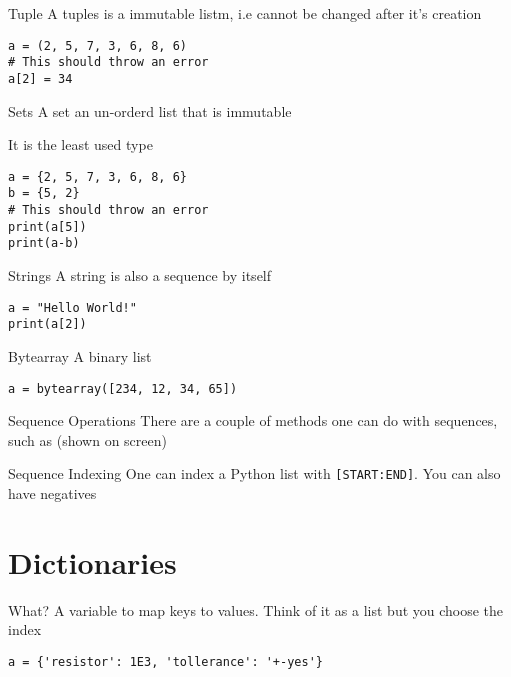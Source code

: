\documentclass[10pt]{beamer}
\begin{document}
\begin{frame}[containsverbatim]{Tuple}
    A tuples is a immutable listm, i.e cannot be changed after it's creation
    \begin{verbatim}
a = (2, 5, 7, 3, 6, 8, 6)
# This should throw an error
a[2] = 34
    \end{verbatim}
\end{frame}

\begin{frame}[containsverbatim]{Sets}
    A set an un-orderd list that is immutable

    It is the least used type
    \begin{verbatim}
a = {2, 5, 7, 3, 6, 8, 6}
b = {5, 2}
# This should throw an error
print(a[5])
print(a-b)
    \end{verbatim}
\end{frame}

\begin{frame}[containsverbatim]{Strings}
    A string is also a sequence by itself
    \begin{verbatim}
a = "Hello World!"
print(a[2])
    \end{verbatim}
\end{frame}

\begin{frame}[containsverbatim]{Bytearray}
    A binary list
    \begin{verbatim}
a = bytearray([234, 12, 34, 65])
    \end{verbatim}
\end{frame}

\begin{frame}[containsverbatim]{Sequence Operations}
    There are a couple of methods one can do with sequences, such as (shown on screen)
\end{frame}

\begin{frame}[containsverbatim]{Sequence Indexing}
    One can index a Python list with \texttt{[START:END]}. You can also have negatives
\end{frame}

\section{Dictionaries}

\begin{frame}[containsverbatim]{What?}
    A variable to map keys to values. Think of it as a list but you choose the index
    \begin{verbatim}
a = {'resistor': 1E3, 'tollerance': '+-yes'}
    \end{verbatim}
\end{frame}
\end{document}

